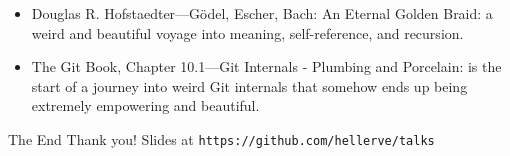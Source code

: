 \documentclass[aspectratio=169]{beamer}
\begin{document}
  \begin{frame}
    \begin{itemize}
      \item Douglas R. Hofstaedter—Gödel, Escher, Bach: An Eternal Golden Braid:
            a weird and beautiful voyage into meaning, self-reference, and
            recursion.
      \item The Git Book, Chapter 10.1—Git Internals - Plumbing and Porcelain:
            is the start of a journey into weird Git internals that somehow ends
            up being extremely empowering and beautiful.
    \end{itemize}
  \end{frame}
  \begin{frame}{The End}
    \Huge Thank you!
    \linebreak
    \linebreak
    \tiny Slides at \texttt{https://github.com/hellerve/talks}
  \end{frame}
\end{document}
